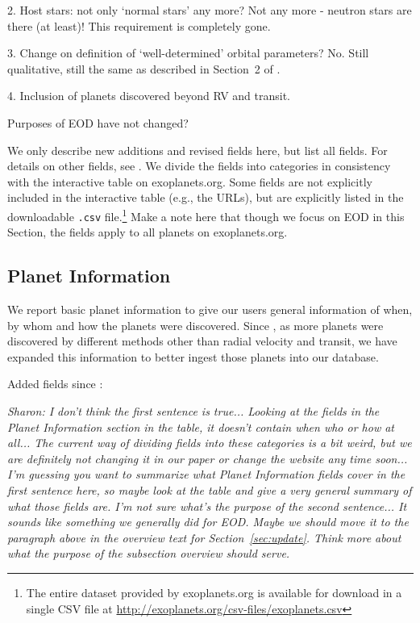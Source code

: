\documentclass[11pt,preprint]{aastex}
\begin{document}
\begin{CJK*}{UTF8}{gbsn}
2. Host stars: not only `normal stars' any more? Not any more -
neutron stars are there (at least)! This requirement is completely gone.

3. Change on definition of `well-determined' orbital parameters? No. Still
qualitative, still the same as described in Section~2 of \cite{Wright2011}.

4. Inclusion of planets discovered beyond RV and transit.

Purposes of EOD have not changed?

We only describe new additions and revised fields here, but list all
fields. For details on other fields, see \cite{Wright2011}. We divide
the fields into categories in consistency with the interactive table
on exoplanets.org. Some fields are not explicitly included in the
interactive table (e.g., the URLs), but are explicitly listed in the
downloadable {\tt .csv} file.\footnote{The entire dataset provided by
  exoplanets.org is available for download in a single CSV file at
  \url{http://exoplanets.org/csv-files/exoplanets.csv}} Make a note
here that though we focus on EOD in this Section, the fields apply to
all planets on exoplanets.org.

\subsection{Planet Information}

We report basic planet information to give our users general
information of when, by whom and how the planets were
discovered. Since \cite{Wright2011}, as more planets were discovered
by different methods other than radial velocity and transit, we have
expanded this information to better ingest those planets into our
database.

Added fields since \cite{Wright2011}:

\textit{Sharon: I don't think the first sentence is true... Looking at
  the fields in the Planet Information section in the table, it
  doesn't contain when who or how at all... The current way of
  dividing fields into these categories is a bit weird, but we are
  definitely not changing it in our paper or change the website any
  time soon... I'm guessing you want to summarize what Planet
  Information fields cover in the first sentence here, so maybe look
  at the table and give a very general summary of what those fields
  are.
  I'm not sure what's the purpose of the second sentence... It sounds
  like something we generally did for EOD. Maybe we should move it to
  the paragraph above in the overview text for
  Section~\ref{sec:update}. Think more about what the purpose of the
  subsection overview should serve.}



\end{CJK*}
\end{document}
